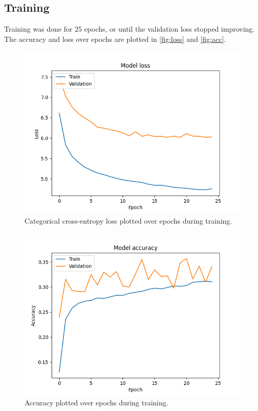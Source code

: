 \documentclass[11pt, twocolumn]{article}
\begin{document}
\subsection{Training}
Training was done for 25 epochs, or until the validation loss stopped improving. The accuracy and loss over epochs are plotted in \autoref{fig:loss} and \autoref{fig:acc}.
\begin{figure}[H]
    \includegraphics[width=\linewidth]{images/loss_bach_big_categorical_crossentropy_Nadam_sigmoid_n86_tps8_ws96.png}
    \caption{Categorical cross-entropy loss plotted over epochs during training.}
    \label{fig:loss}
\end{figure}
\begin{figure}[H]
    \includegraphics[width=\linewidth]{images/acc_bach_big_categorical_crossentropy_Nadam_sigmoid_n86_tps8_ws96.png}
    \caption{Accuracy plotted over epochs during training.}
    \label{fig:acc}
\end{figure}
\end{document}
